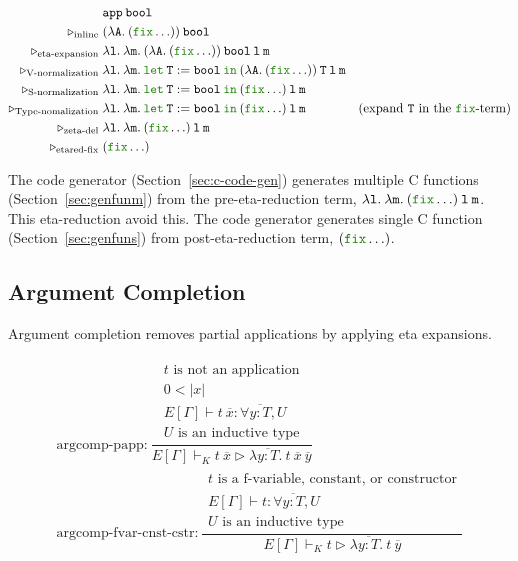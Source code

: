 \documentclass[a4paper,fleqn]{article}
\newcommand{\kwlet}{\mbox{\color{mygreen}\ttfamily let}}
\newcommand{\kwin}{\mbox{\color{mygreen}\ttfamily in}}
\newcommand{\kwfix}{\mbox{\color{mygreen}\ttfamily fix}}
\newcommand{\lam}[2]{\lambda #1.\:#2}
\newcommand{\letin}[3]{\kwlet\:#1:=#2\:\kwin\:#3}
\newcommand{\breakrule}{\\[0.5em]}
\newcommand{\secref}[1]{Section~\ref{#1}}
\newcommand{\reltri}{\mathrel{\triangleright}}
\newcommand{\rep}[1]{\overline{#1}}
\begin{document}
\begin{align*}
  & \ttapp\:\ttbool \\
  \reltri_\textrm{inline}\; & (\lam{\ttA}{(\kwfix \ldots)})\:\ttbool \\
  \reltri_\textrm{eta-expansion}\; & \lam{\ttl}{\lam{\ttm}{(\lam{\ttA}{(\kwfix \ldots)})\:\ttbool\:\ttl\:\ttm}} \\
  \reltri_\textrm{V-normalization}\; & \lam{\ttl}{\lam{\ttm}{\letin{\ttT}{\ttbool}{(\lam{\ttA}{(\kwfix \ldots)})\:\ttT\:\ttl\:\ttm}}} \\
  \reltri_\textrm{S-normalization}\; & \lam{\ttl}{\lam{\ttm}{\letin{\ttT}{\ttbool}{(\kwfix \ldots)\:\ttl\:\ttm}}} \\
  \reltri_\textrm{Type-nomalization}\; & \lam{\ttl}{\lam{\ttm}{\letin{\ttT}{\ttbool}{(\kwfix \ldots)\:\ttl\:\ttm}}} & \textrm{(expand $\ttT$ in the \kwfix-term)} \\
  \reltri_\textrm{zeta-del}\; & \lam{\ttl}{\lam{\ttm}{(\kwfix \ldots)\:\ttl\:\ttm}} \\
  \reltri_\textrm{etared-fix}\; & (\kwfix \ldots) \\
\end{align*}

The code generator (\secref{sec:c-code-gen}) generates multiple C functions (\secref{sec:genfunm}) from the pre-eta-reduction term, $\lam{\ttl}{\lam{\ttm}{(\kwfix \ldots)\:\ttl\:\ttm}}$.
This eta-reduction avoid this.
The code generator generates single C function (\secref{sec:genfuns}) from post-eta-reduction term, $(\kwfix \ldots)$.

\subsection{Argument Completion}\label{sec:argcomp}
Argument completion removes partial applications by applying eta expansions.

\begin{gather*}
  \text{argcomp-papp:}~
    \dfrac{
      \begin{gathered}
        \text{$t$ is not an application} \\
        0 < |x| \\
        E[\Gamma] \vdash t\:\rep{x} : \forall \rep{y{:}T}, U \\
        \text{$U$ is an inductive type}
      \end{gathered}
    }{E[\Gamma] \vdash_K
        t\:\rep{x}
        \reltri
        \lam{\rep{y{:}T}}{t\:\rep{x}\:\rep{y}}
    } \breakrule
  \text{argcomp-fvar-cnst-cstr:}~
    \dfrac{
      \begin{gathered}
        \text{$t$ is a f-variable, constant, or constructor} \\
        E[\Gamma] \vdash t : \forall \rep{y{:}T}, U \\
        \text{$U$ is an inductive type}
      \end{gathered}
    }{E[\Gamma] \vdash_K
        t
        \reltri
        \lam{\rep{y{:}T}}{t\:\rep{y}}
    }
\end{gather*}
\end{document}
